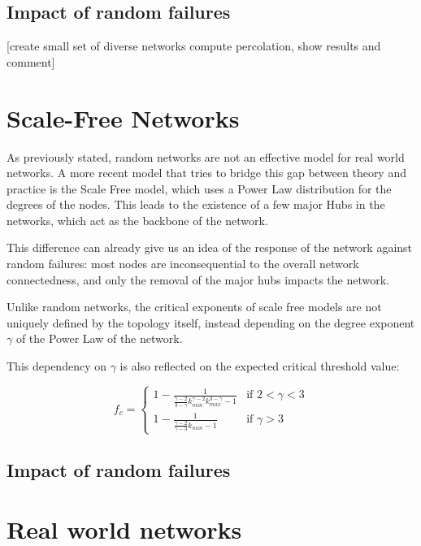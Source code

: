 \documentclass[
]{article}
\begin{document}
\hypertarget{impact-of-random-failures}{%
\subsection{Impact of random failures}\label{impact-of-random-failures}}

{[}create small set of diverse networks compute percolation, show
results and comment{]}

\hypertarget{scale-free-networks}{%
\section{Scale-Free Networks}\label{scale-free-networks}}

As previously stated, random networks are not an effective model for
real world networks. A more recent model that tries to bridge this gap
between theory and practice is the Scale Free model, which uses a Power
Law distribution for the degrees of the nodes. This leads to the
existence of a few major Hubs in the networks, which act as the backbone
of the network.

This difference can already give us an idea of the response of the
network against random failures: most nodes are inconsequential to the
overall network connectedness, and only the removal of the major hubs
impacts the network.

Unlike random networks, the critical exponents of scale free models are
not uniquely defined by the topology itself, instead depending on the
degree exponent \(\gamma\) of the Power Law of the network.

This dependency on \(\gamma\) is also reflected on the expected critical
threshold value:

\[
f_c = \begin{cases}
   1-\frac{1}{\frac{\gamma-2}{3-\gamma}k_{min}^{\gamma-2}k_{max}^{3-\gamma}-1} &\text{if } 2 < \gamma < 3 \\
   1-\frac{1}{\frac{\gamma-2}{\gamma-3}k_{min}-1} &\text{if } \gamma > 3
\end{cases}
\]

\hypertarget{impact-of-random-failures-1}{%
\subsection{Impact of random
failures}\label{impact-of-random-failures-1}}

\hypertarget{real-world-networks}{%
\section{Real world networks}\label{real-world-networks}}
\end{document}
